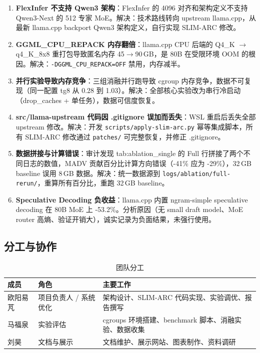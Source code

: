 \begin{enumerate}
    \item \textbf{FlexInfer 不支持 Qwen3 架构}：FlexInfer 的 4096 对齐和架构定义不支持 Qwen3-Next 的 512 专家 MoE。解决：技术路线转向 upstream llama.cpp，从最新 llama.cpp backport Qwen3 架构定义，自行实现 SLIM-ARC 修改。
    \item \textbf{GGML\_CPU\_REPACK 内存翻倍}：llama.cpp CPU 后端的 Q4\_K $\to$ q4\_K\_8x8 重打包导致匿名内存 45$\to$90\,GB，是 80B 在受限环境 OOM 的根因。解决：\texttt{-DGGML\_CPU\_REPACK=OFF} 禁用，内存减半。
    \item \textbf{并行实验导致内存竞争}：三组消融并行跑导致 cgroup 内存竞争，数据不可复现（同一配置 tg8 从 0.28 到 1.03）。解决：全部核心实验改为串行冷启动（drop\_caches + 单任务），数据可信度恢复。
    \item \textbf{src/llama-upstream 代码因 .gitignore 误加而丢失}：WSL 重启后丢失全部 upstream 修改。解决：开发 \texttt{scripts/apply-slim-arc.py} 幂等集成脚本，所有 SLIM-ARC 修改通过 \texttt{patches/} 可完整恢复，并修正 .gitignore。
    \item \textbf{数据拼接与计算错误}：审计发现 tab:ablation\_single 的 Full 行拼接了两个不同日志的数值，MADV 贡献百分比计算方向错误（-41\% 应为 -29\%），32\,GB baseline 误用 8\,GB 数据。解决：统一数据源到 \texttt{logs/ablation/full-rerun/}，重算所有百分比，重跑 32\,GB baseline。
    \item \textbf{Speculative Decoding 负收益}：llama.cpp 内置 ngram-simple speculative decoding 在 80B MoE 上 -53.2\%。分析原因（无 small draft model、MoE router 高熵、验证开销大），诚实记录为负面结果，未强行使用。
\end{enumerate}

\subsection{分工与协作}

\begin{table}[H]
    \centering
    \caption{团队分工}
    \label{tab:team}
    \begin{tabular}{lll}
        \toprule
        \textbf{成员} & \textbf{角色} & \textbf{主要工作} \\
        \midrule
        欧阳易芃 & 项目负责人 / 系统优化 & 架构设计、SLIM-ARC 代码实现、实验调优、报告撰写 \\
        马福泉 & 实验评估 & cgroups 环境搭建、benchmark 脚本、消融实验、数据收集 \\
        刘昊 & 文档与展示 & 文档维护、展示网站、图表制作、资料调研 \\
        \bottomrule
    \end{tabular}
\end{table}

